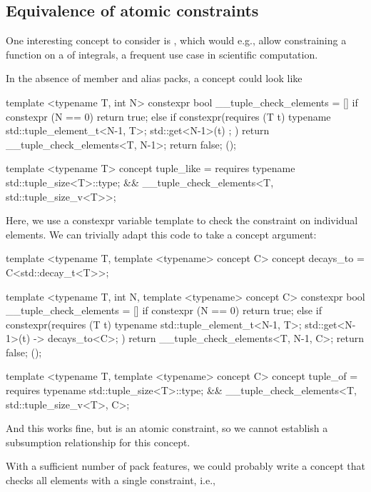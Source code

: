 \documentclass{wg21}
\begin{document}
\subsection{Equivalence of atomic constraints}

One interesting concept to consider is , which would e.g., allow constraining a function on a 
of integrals, a frequent use case in scientific computation.

In the absence of member and alias packs, a  concept could look like

\begin{colorblock}
template <typename T, int N>
constexpr bool __tuple_check_elements = [] {
    if constexpr (N == 0)
      return true;
    else if constexpr(requires (T t) {
        typename std::tuple_element_t<N-1, T>;
        { std::get<N-1>(t) };
    })
      return  __tuple_check_elements<T, N-1>;
    return false;
}();

template <typename T>
concept tuple_like = requires {
    typename std::tuple_size<T>::type;
} &&  __tuple_check_elements<T, std::tuple_size_v<T>>;
\end{colorblock}

Here, we use a constexpr variable template to check the constraint on individual elements.
We can trivially adapt this code to take a concept argument:

\begin{colorblock}
template <typename T, template <typename> concept C>
concept decays_to = C<std::decay_t<T>>;

template <typename T, int N, template <typename> concept C>
constexpr bool __tuple_check_elements = [] {
    if constexpr (N == 0)
      return true;
    else if constexpr(requires (T t) {
        typename std::tuple_element_t<N-1, T>;
        { std::get<N-1>(t) } -> decays_to<C>;
    })
      return  __tuple_check_elements<T, N-1, C>;
    return false;
}();

template <typename T, template <typename> concept C>
concept tuple_of = requires {
    typename std::tuple_size<T>::type;
} &&  __tuple_check_elements<T, std::tuple_size_v<T>, C>;
\end{colorblock}

And this works fine, but  is an atomic constraint, so we cannot
establish a subsumption relationship for this concept.

With a sufficient number of pack features, we could probably write a concept that checks all elements with a single constraint,
i.e.,
\end{document}
